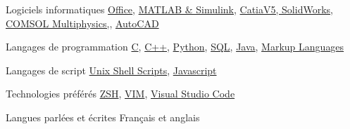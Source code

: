

\begin{cvskills}

  \cvskill
    {Logiciels informatiques} %
    {\href{https://www.office.com/}{Office},
     \href{https://www.mathworks.com/}{MATLAB \& Simulink},
     \href{https://www.3ds.com/products-services/}{CatiaV5, SolidWorks},
     \href{https://www.comsol.com/}{COMSOL Multiphysics,},
     \href{https://www.autodesk.ca/en/products/autocad/overview}{AutoCAD}
    } %

  \cvskill
    {Langages de programmation} %
    {\href{https://en.cppreference.com/w/c/languagehttps://en.cppreference.com/w/c/language}{C},
     \href{https://en.cppreference.com/w/cpp/language}{C++},
     \href{https://www.python.org/}{Python},
     \href{https://docs.oracle.com/en/database/other-databases/index.html}{SQL},
     \href{https://docs.oracle.com/en/java/index.html}{Java},
     \href{https://techterms.com/definition/markup_language}{Markup Languages}
    } %

  \cvskill
    {Langages de script} %
    {\href{https://www.gnu.org/software/bash/}{Unix Shell Scripts},
     \href{https://developer.oracle.com/ca-en/javascript/}{Javascript}
    }

  \cvskill
    {Technologies préférés} %
    {\href{http://zsh.sourceforge.net/}{ZSH},
     \href{https://www.vim.org/}{VIM},
     \href{https://code.visualstudio.com/}{Visual Studio Code}
    } %

  \cvskill
    {Langues parlées et écrites} %
    {Français et anglais} %

\end{cvskills}
